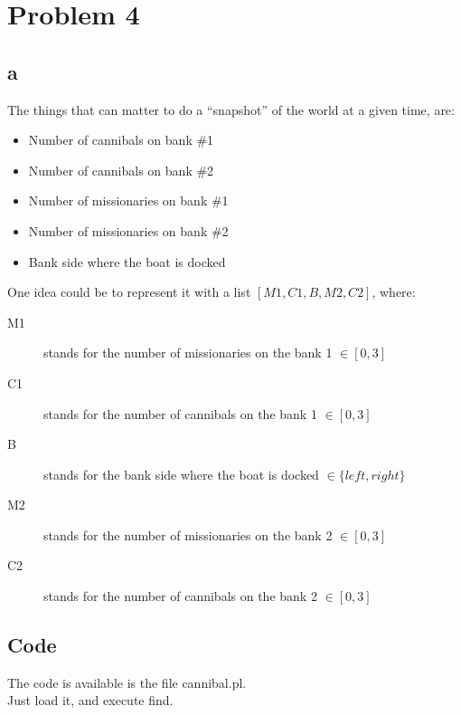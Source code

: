 \documentclass{article}
\begin{document}
    \section{Problem 4}
        \subsection{a}
            The things that can matter to do a ``snapshot'' of the world at a given time, are:
            \begin{itemize}
                \item Number of cannibals on bank \#1
                \item Number of cannibals on bank \#2
                \item Number of missionaries on bank \#1
                \item Number of missionaries on bank \#2
                \item Bank side where the boat is docked
            \end{itemize}
            One idea could be to represent it with a list $[M1, C1, B, M2, C2]$, where:
            \begin{description}
                \item[M1] stands for the number of missionaries on the bank 1 $\in[0, 3]$
                \item[C1] stands for the number of cannibals on the bank 1 $\in[0, 3]$
                \item[B] stands for the bank side  where the boat is docked $\in\{left, right\}$
                \item[M2] stands for the number of missionaries on the bank 2 $\in[0, 3]$
                \item[C2] stands for the number of cannibals on the bank 2 $\in[0, 3]$
            \end{description}
        \subsection{Code}
            The code is available is the file cannibal.pl.\\
            Just load it, and execute find.
\end{document}
